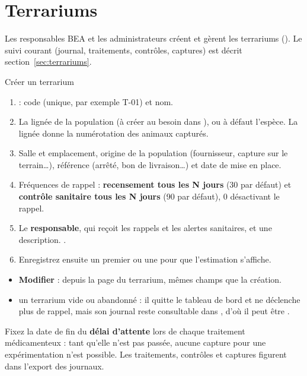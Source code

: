 \documentclass[11pt,a4paper]{article}
\begin{document}
\section{Terrariums}\label{sec:terrariums-admin}
Les responsables BEA et les administrateurs créent et gèrent les terrariums
(). Le suivi courant (journal,
traitements, contrôles, captures) est décrit section~\ref{sec:terrariums}.

\begin{procedure}{Créer un terrarium}
\begin{enumerate}
  \item {} : code (unique, par exemple T-01) et nom.
  \item La lignée de la population (à créer au besoin dans
    ), ou à défaut l'espèce. La lignée donne la
    numérotation des animaux capturés.
  \item Salle et emplacement, origine de la population (fournisseur,
    capture sur le terrain…), référence (arrêté, bon de livraison…) et date
    de mise en place.
  \item Fréquences de rappel : \textbf{recensement tous les N jours} (30 par
    défaut) et \textbf{contrôle sanitaire tous les N jours} (90 par défaut),
    0 désactivant le rappel.
  \item Le \textbf{responsable}, qui reçoit les rappels et les alertes
    sanitaires, et une description. .
  \item Enregistrez ensuite un premier  ou une
     pour que l'estimation s'affiche.
\end{enumerate}
\end{procedure}
\begin{itemize}
  \item \textbf{Modifier} : depuis la page du terrarium, mêmes champs que la
    création.
  \item {} un terrarium vide ou abandonné : il quitte le tableau
    de bord et ne déclenche plus de rappel, mais son journal reste
    consultable dans , d'où il peut être
    .
\end{itemize}
\begin{regle}
Fixez la date de fin du \textbf{délai d'attente} lors de chaque traitement
médicamenteux : tant qu'elle n'est pas passée, aucune capture pour une
expérimentation n'est possible. Les traitements, contrôles et captures
figurent dans l'export des journaux.
\end{regle}
\end{document}
